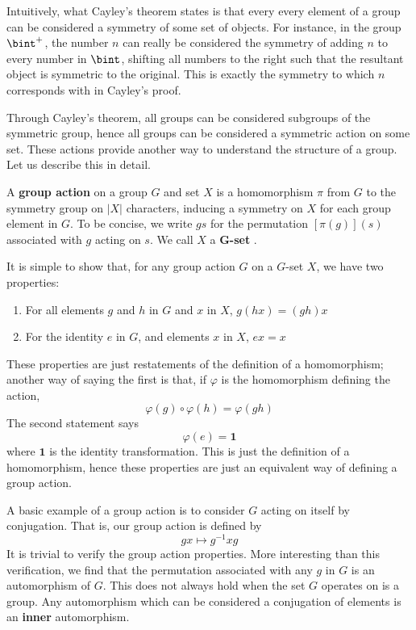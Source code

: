 Intuitively, what Cayley's theorem states is that every every element of a group can be considered a symmetry of some set of objects. For instance, in the group $\bint^+$, the number $n$ can really be considered the symmetry of adding $n$ to every number in $\bint$, shifting all numbers to the right such that the resultant object is symmetric to the original. This is exactly the symmetry to which $n$ corresponds with in Cayley's proof.

Through Cayley's theorem, all groups can be considered subgroups of the symmetric group, hence all groups can be considered a symmetric action on some set. These actions provide another way to understand the structure of a group. Let us describe this in detail.

\begin{definition}
A {\bf group action}  on a group $G$ and set $X$ is a homomorphism $\pi$ from $G$ to the symmetry group on $|X|$ characters, inducing a symmetry on $X$ for each group element in $G$. To be concise, we write $gs$ for the permutation $[\pi(g)](s)$ associated with $g$ acting on $s$. We call $X$ a {\bf G-set} .
\end{definition}

It is simple to show that, for any group action $G$ on a $G$-set $X$, we have two properties:
%
\begin{enumerate}
    \item For all elements $g$ and $h$ in $G$ and $x$ in $X$, $g(hx) = (gh)x$
    \item For the identity $e$ in $G$, and elements $x$ in $X$, $ex = x$
\end{enumerate}
%
These properties are just restatements of the definition of a homomorphism; another way of saying the first is that, if $\varphi$ is the homomorphism defining the action,%
\[\varphi(g) \circ \varphi(h) = \varphi(gh) \]
%
The second statement says
%
\[ \varphi(e) = \mathbf{1} \]
%
where $\mathbf{1}$ is the identity transformation. This is just the definition of a homomorphism, hence these properties are just an equivalent way of defining a group action.

A basic example of a group action is to consider $G$ acting on itself by conjugation. That is, our group action is defined by
%
\[ gx \mapsto g^{-1}xg \]
%
It is trivial to verify the group action properties. More interesting than this verification, we find that the permutation associated with any $g$ in $G$ is an automorphism of $G$. This does not always hold when the set $G$ operates on is a group. Any automorphism which can be considered a conjugation of elements is an {\bf inner} automorphism.

